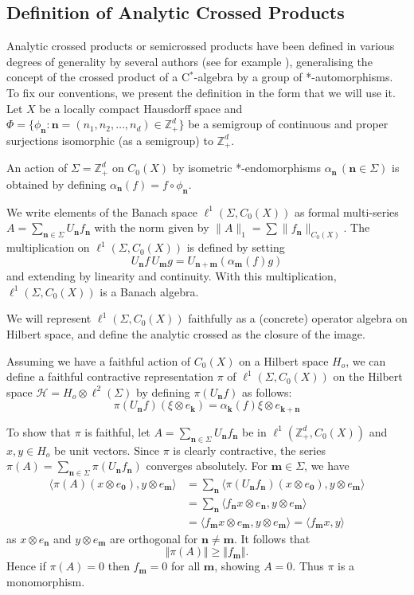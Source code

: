 \documentclass[12pt]{amsart}
\theoremstyle{definition}
\newcommand{\mcH}{\mathcal{H}}
\newcommand{\bbZ}{\mathbb{Z}}
\newcommand{\cstar}{C$^*$}
\newcommand{\bo}[1]{\mathbf{#1}}
\newcommand{\bom}{\mathbf{m}}
\newcommand{\bon}{\mathbf{n}}
\newcommand{\gS}{{\Sigma}}
\begin{document}
\subsection{Definition of Analytic Crossed Products}
Analytic crossed products or semicrossed products have been defined
in various degrees of generality by several authors (see for example
\cite{HadHoo88,Lam96a,Pet84,Pet88a,Pow92b}), generalising the concept
of the crossed product of a \cstar-algebra by a group of *-automorphisms.
To fix our conventions, we present the definition in the form that
we will use it.
Let $X$ be a locally compact Hausdorff space and
$\Phi = \{ \phi_\bon : \bon = (n_1,n_2, \ldots, n_d) \in \bbZ_+^d \}$
be a semigroup of continuous and proper surjections isomorphic
(as a semigroup) to $\bbZ_+^d$.

An action of $\gS =\bbZ_+^d$ on $C_0(X)$ by
isometric *-endomorphisms $\alpha_\bon \, (\bon \in \gS)$ is
obtained by defining $\alpha_\bon(f)=f\circ\phi_\bon$.

We write elements of the Banach space $\ell^{1}(\gS,C_0(X))$ as formal
multi-series $A=\sum_{\bon \in \gS } U_\bon f_\bon$ with the norm
given by $\| A \|_1=\sum \| f_\bon \|_{C_0(X)}$. The multiplication
on $\ell^1(\gS,C_0(X))$ is defined by setting
\[ U_\bon f\, U_\bom g = U_{\bon+\bom} (\alpha_\bom(f)g) \]
and extending by linearity and continuity. With this
multiplication, $\ell^1 (\gS,C_0(X))$ is a Banach algebra.

We will represent $\ell^1 (\gS,C_0(X))$ faithfully as a (concrete)
operator algebra on Hilbert space, and define the analytic crossed
as the closure of the image.

Assuming we have a faithful action of $C_0(X)$ on a Hilbert space
$H_o$, we can define a faithful contractive representation $\pi$
of $\ell^1(\gS,C_0(X))$ on the Hilbert space
$\mcH=H_{o}\otimes\ell^{2}(\gS)$ 
by defining $\pi(U_{\bon}f)$ as follows:
\[ \pi(U_{\bon} f) (\xi\otimes e_{\bo{k}}) =
    \alpha_{\bo{k}}(f)\xi\otimes e_{\bo{k+n}} \]

To show that $\pi$ is faithful, let
$A=\sum_{\bon\in\gS} U_\bon f_\bon$ be in $\ell^1(\bbZ_+^d,C_0(X))$
and $x,y\in H_{o}$ be unit vectors.
Since $\pi$ is clearly contractive, the series
$\pi(A)=\sum_{\bon\in\gS} \pi(U_\bon f_\bon)$ converges absolutely.
For $\bom \in \gS$, we have
\begin{align*}
\langle\pi(A)(x\otimes e_{\bo{0}}),y\otimes e_{\bom}\rangle
 &=\sum_{\bon}\langle\pi(U_{\bon} f_{\bon})(x\otimes e_{\bo{0}}),
    y\otimes e_{\bom}\rangle\\
 &=\sum_{\bon} \langle f_\bon x
    \otimes e_\bon, y\otimes e_{\bom} \rangle \\
 &=\langle f_{\bom} x\otimes e_{\bom},
    y\otimes e_\bom\rangle = \langle f_{\bom} x,y\rangle
\end{align*}
as $x\otimes e_\bon$ and $y\otimes e_\bom$ are orthogonal
for $\bon\neq\bom$.
It follows that
\[
\Vert\pi(A)\Vert\geq\Vert f_{\bom}\Vert.
\]
Hence if $\pi(A)=0$ then $f_{\bom}=0$ for all $\bom$, showing $A=0$.
Thus $\pi$ is a monomorphism.
\end{document}
